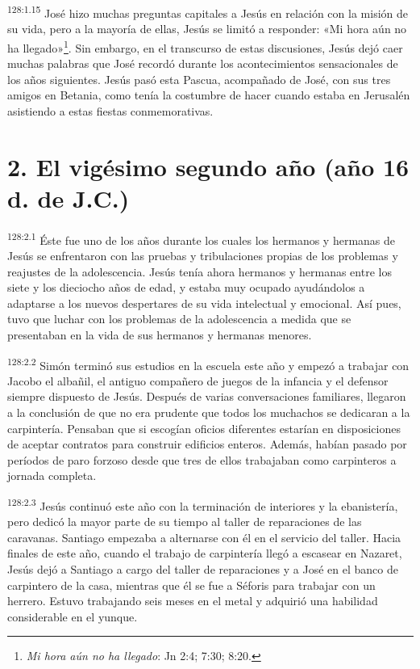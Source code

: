 \par 
\textsuperscript{128:1.15} José hizo muchas preguntas capitales a Jesús en relación con la misión de su vida, pero a la mayoría de ellas, Jesús se limitó a responder: «Mi hora aún no ha llegado»\footnote{\textit{Mi hora aún no ha llegado}: Jn 2:4; 7:30; 8:20.}. Sin embargo, en el transcurso de estas discusiones, Jesús dejó caer muchas palabras que José recordó durante los acontecimientos sensacionales de los años siguientes. Jesús pasó esta Pascua, acompañado de José, con sus tres amigos en Betania, como tenía la costumbre de hacer cuando estaba en Jerusalén asistiendo a estas fiestas conmemorativas.

\section*{2. El vigésimo segundo año (año 16 d. de J.C.)}
\par 
\textsuperscript{128:2.1} Éste fue uno de los años durante los cuales los hermanos y hermanas de Jesús se enfrentaron con las pruebas y tribulaciones propias de los problemas y reajustes de la adolescencia. Jesús tenía ahora hermanos y hermanas entre los siete y los dieciocho años de edad, y estaba muy ocupado ayudándolos a adaptarse a los nuevos despertares de su vida intelectual y emocional. Así pues, tuvo que luchar con los problemas de la adolescencia a medida que se presentaban en la vida de sus hermanos y hermanas menores.

\par 
\textsuperscript{128:2.2} Simón terminó sus estudios en la escuela este año y empezó a trabajar con Jacobo el albañil, el antiguo compañero de juegos de la infancia y el defensor siempre dispuesto de Jesús. Después de varias conversaciones familiares, llegaron a la conclusión de que no era prudente que todos los muchachos se dedicaran a la carpintería. Pensaban que si escogían oficios diferentes estarían en disposiciones de aceptar contratos para construir edificios enteros. Además, habían pasado por períodos de paro forzoso desde que tres de ellos trabajaban como carpinteros a jornada completa.

\par 
\textsuperscript{128:2.3} Jesús continuó este año con la terminación de interiores y la ebanistería, pero dedicó la mayor parte de su tiempo al taller de reparaciones de las caravanas. Santiago empezaba a alternarse con él en el servicio del taller. Hacia finales de este año, cuando el trabajo de carpintería llegó a escasear en Nazaret, Jesús dejó a Santiago a cargo del taller de reparaciones y a José en el banco de carpintero de la casa, mientras que él se fue a Séforis para trabajar con un herrero. Estuvo trabajando seis meses en el metal y adquirió una habilidad considerable en el yunque.

